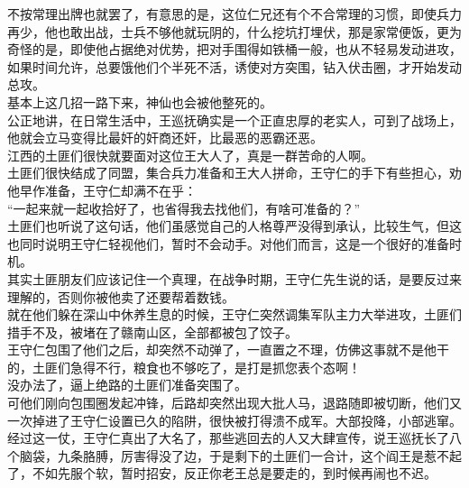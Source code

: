 \begin{multicols}{\theparacolNo}
不按常理出牌也就罢了，有意思的是，这位仁兄还有个不合常理的习惯，即使兵力再少，他也敢出战，士兵不够他就玩阴的，什么挖坑打埋伏，那是家常便饭，更为奇怪的是，即使他占据绝对优势，把对手围得如铁桶一般，也从不轻易发动进攻，如果时间允许，总要饿他们个半死不活，诱使对方突围，钻入伏击圈，才开始发动总攻。\\

基本上这几招一路下来，神仙也会被他整死的。\\

公正地讲，在日常生活中，王巡抚确实是一个正直忠厚的老实人，可到了战场上，他就会立马变得比最奸的奸商还奸，比最恶的恶霸还恶。\\

江西的土匪们很快就要面对这位王大人了，真是一群苦命的人啊。\\

土匪们很快结成了同盟，集合兵力准备和王大人拼命，王守仁的手下有些担心，劝他早作准备，王守仁却满不在乎：\\

“一起来就一起收拾好了，也省得我去找他们，有啥可准备的？”\\

土匪们也听说了这句话，他们虽感觉自己的人格尊严没得到承认，比较生气，但这也同时说明王守仁轻视他们，暂时不会动手。对他们而言，这是一个很好的准备时机。\\

其实土匪朋友们应该记住一个真理，在战争时期，王守仁先生说的话，是要反过来理解的，否则你被他卖了还要帮着数钱。\\

就在他们躲在深山中休养生息的时候，王守仁突然调集军队主力大举进攻，土匪们措手不及，被堵在了赣南山区，全部都被包了饺子。\\

王守仁包围了他们之后，却突然不动弹了，一直置之不理，仿佛这事就不是他干的，土匪们急得不行，粮食也不够吃了，是打是抓您表个态啊！\\

没办法了，逼上绝路的土匪们准备突围了。\\

可他们刚向包围圈发起冲锋，后路却突然出现大批人马，退路随即被切断，他们又一次掉进了王守仁设置已久的陷阱，很快被打得溃不成军。大部投降，小部逃窜。\\

经过这一仗，王守仁真出了大名了，那些逃回去的人又大肆宣传，说王巡抚长了八个脑袋，九条胳膊，厉害得没了边，于是剩下的土匪们一合计，这个阎王是惹不起了，不如先服个软，暂时招安，反正你老王总是要走的，到时候再闹也不迟。\\


\end{multicols}
